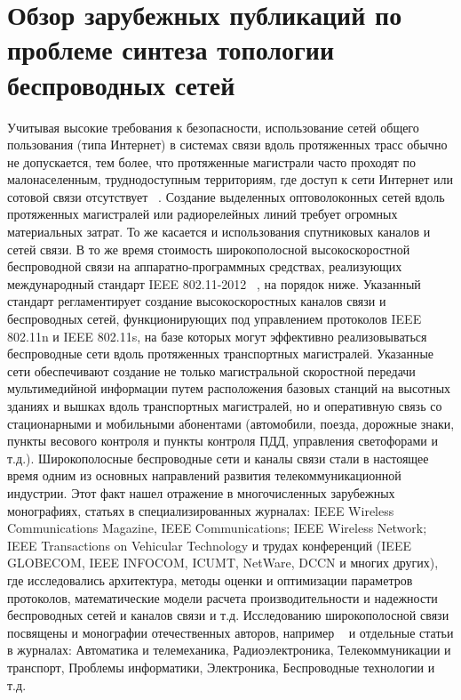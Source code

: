 \chapter{Обзор зарубежных публикаций по проблеме синтеза топологии беспроводных сетей}	\label{observation}
Учитывая высокие требования к безопасности, использование сетей общего пользования (типа Интернет) в системах связи вдоль протяженных трасс обычно не допускается, тем более, что протяженные магистрали часто проходят по малонаселенным, труднодоступным территориям, где доступ к сети Интернет или сотовой связи отсутствует ~\cite{Vishnevsky1, Vishnevsky2}. Создание выделенных оптоволоконных сетей вдоль протяженных магистралей или радиорелейных линий требует огромных материальных затрат. То же касается и использования спутниковых каналов и сетей связи. В то же время стоимость широкополосной высокоскоростной беспроводной связи на аппаратно-программных средствах, реализующих международный стандарт IEEE 802.11-2012 ~\cite{802.11-2012}, на порядок ниже. Указанный стандарт регламентирует создание высокоскоростных каналов связи и беспроводных сетей, функционирующих под управлением протоколов IEEE 802.11n и IEEE 802.11s, на базе которых могут эффективно реализовываться беспроводные сети вдоль протяженных транспортных магистралей. Указанные сети обеспечивают создание не только магистральной скоростной передачи мультимедийной информации путем расположения базовых станций на высотных зданиях и вышках вдоль транспортных магистралей, но и оперативную связь со стационарными и мобильными абонентами (автомобили, поезда, дорожные знаки, пункты весового контроля и пункты контроля ПДД, управления светофорами и т.д.). 
Широкополосные беспроводные сети и каналы связи стали в настоящее время одним из основных направлений развития телекоммуникационной индустрии. Этот факт нашел отражение в многочисленных зарубежных монографиях, статьях в специализированных журналах: IEEE Wireless Communications Magazine, IEEE Communications; IEEE Wireless Network; IEEE Transactions on Vehicular Technology и трудах конференций (IEEE GLOBECOM, IEEE INFOCOM, ICUMT, NetWare, DCCN и многих других), где исследовались архитектура, методы оценки и оптимизации параметров протоколов, математические модели расчета производительности и надежности  беспроводных сетей и каналов связи и т.д. Исследованию широкополосной связи посвящены и монографии отечественных авторов, например ~\cite{Vishnevsky1, Vishnevsky2} и отдельные статьи в журналах: Автоматика и телемеханика, Радиоэлектроника, Телекоммуникации и транспорт, Проблемы информатики, Электроника, Беспроводные технологии и т.д. 
